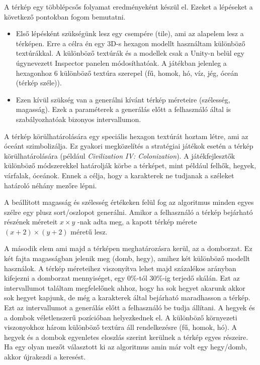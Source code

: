 \newpage
A térkép egy többlépcsős folyamat eredményeként készül el. Ezeket a lépéseket a következő pontokban fogom bemutatni.
\begin{itemize}
\item Első lépésként szükségünk lesz egy csempére (tile), ami az alapelem lesz a térképen. Erre a célra én egy 3D-s hexagon modellt használtam különböző textúrákkal. A különböző textúrák és a modellek csak a Unity-n belül egy úgynevezett Inspector panelen módosíthatóak. A játékban jelenleg a hexagonhoz 6 különböző textúra szerepel (fű, homok, hó, víz, jég, óceán (térkép széle)).
\item Ezen kívül szükség van a generálni kívánt térkép méreteire (szélesség, magasság). Ezek a paraméterek a generálás előtt a felhasználó által is szabályozhatóak bizonyos intervallumon.
\end{itemize}


A térkép körülhatárolására egy speciális hexagon textúrát hoztam létre, ami az óceánt szimbolizálja. Ez gyakori megközelítés a stratégiai játékok esetén a térkép körülhatárolására (például \textit{Civilization IV: Colonization}). A játékfejlesztők különböző módszerekkel határolják körbe a térképet, mint például felhők, hegyek, várfalak, óceánok. Ennek a célja, hogy a karakterek ne tudjanak a széleket határoló néhány mezőre lépni.

A beállított magasság és szélesség értékeken felül fog az algoritmus minden egyes szélre egy plusz sort/oszlopot generálni. Amikor a felhasználó a térkép bejárható részének méreteit $x \times y$ -nak adta meg, a kapott térkép mérete $(x+2) \times (y+2)$ méretű lesz.


A második elem ami majd a térképen meghatározásra kerül, az a domborzat. Ez két fajta magasságban jelenik meg (domb, hegy), amihez két különböző modellt használok. A térkép méreteihez viszonyítva lehet majd százalékos arányban kifejezni a domborzat mennyiséget, egy $0\%$-tól $30\%$-ig terjedő skálán. Ezt az intervallumot találtam megfelelőnek ahhoz, hogy ha sok hegyet akarunk akkor sok hegyet kapjunk, de még a karakterek által bejárható maradhasson a térkép. Ezt az intervallumot a generálás előtt a felhasználó be tudja állítani. A hegyek és a dombok véletlenszerű pozícióban helyezkednek el. A különböző környezeti viszonyokhoz három különböző textúra áll rendelkezésre (fű, homok, hó). A hegyek és a dombok egyenletes eloszlás szerint kerülnek a térkép egyes részeire. Ha egy olyan mezőt választott ki az algoritmus amin már volt egy hegy/domb, akkor újrakezdi a keresést.

